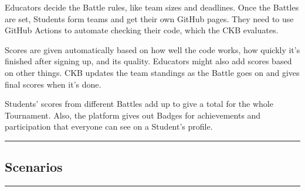\documentclass{Configuration_Files/Template}
\begin{document}
Educators decide the Battle rules, like team sizes and deadlines. Once the Battles are set, Students form teams and get their own GitHub pages. They need to use GitHub Actions to automate checking their code, which the CKB evaluates.

Scores are given automatically based on how well the code works, how quickly it's finished after signing up, and its quality. Educators might also add scores based on other things. CKB updates the team standings as the Battle goes on and gives final scores when it's done.

Students' scores from different Battles add up to give a total for the whole Tournament. Also, the platform gives out Badges for achievements and participation that everyone can see on a Student's profile.

{\color{bluepoli}\rule{\linewidth}{0.1pt}}

\subsection{Scenarios}

{\color{bluepoli}\rule{\linewidth}{0.1pt}}
\end{document}
